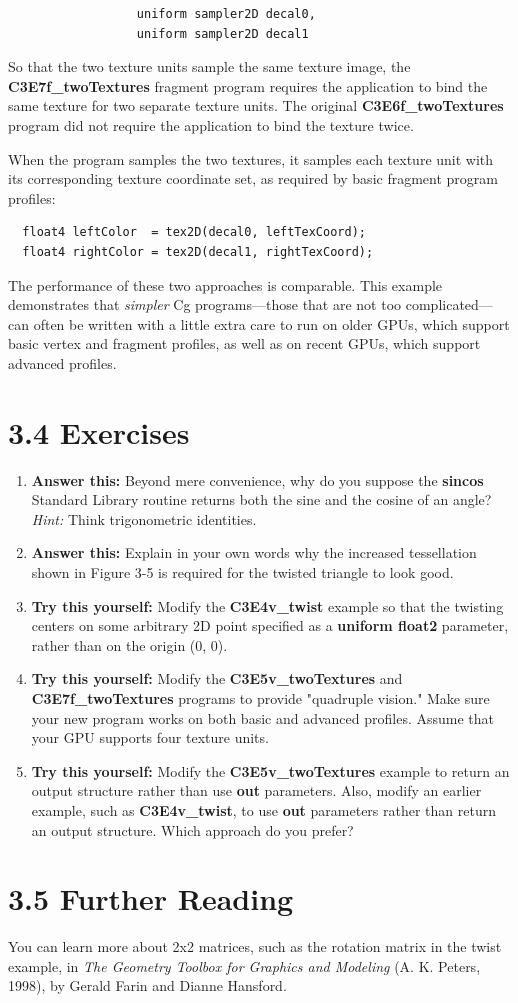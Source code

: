 \documentclass{book}
\begin{document}
\FloatBarrier
\begin{lstlisting}                  
                  uniform sampler2D decal0,
                  uniform sampler2D decal1
\end{lstlisting}
\FloatBarrier

So that the two texture units sample the same texture image, the \textbf{C3E7f_twoTextures} fragment program requires the application to bind the same texture for two separate texture units. The original \textbf{C3E6f_twoTextures} program did not require the application to bind the texture twice.

When the program samples the two textures, it samples each texture unit with its corresponding texture coordinate set, as required by basic fragment program profiles:

\FloatBarrier
\begin{lstlisting} 
  float4 leftColor  = tex2D(decal0, leftTexCoord);
  float4 rightColor = tex2D(decal1, rightTexCoord);
\end{lstlisting}
\FloatBarrier

The performance of these two approaches is comparable. This example demonstrates that \textit{simpler} Cg programs—those that are not too complicated—can often be written with a little extra care to run on older GPUs, which support basic vertex and fragment profiles, as well as on recent GPUs, which support advanced profiles.

\section{3.4 Exercises}

\begin{enumerate}
\item \textbf{Answer this:} Beyond mere convenience, why do you suppose the \textbf{sincos} Standard Library routine returns both the sine and the cosine of an angle? \textit{Hint:} Think trigonometric identities.
\item \textbf{Answer this:} Explain in your own words why the increased tessellation shown in Figure 3-5 is required for the twisted triangle to look good.
\item \textbf{Try this yourself:} Modify the \textbf{C3E4v_twist} example so that the twisting centers on some arbitrary 2D point specified as a \textbf{uniform float2} parameter, rather than on the origin (0, 0).
\item \textbf{Try this yourself:} Modify the \textbf{C3E5v_twoTextures} and \textbf{C3E7f_twoTextures} programs to provide "quadruple vision." Make sure your new program works on both basic and advanced profiles. Assume that your GPU supports four texture units.
\item \textbf{Try this yourself:} Modify the \textbf{C3E5v_twoTextures} example to return an output structure rather than use \textbf{out} parameters. Also, modify an earlier example, such as \textbf{C3E4v_twist}, to use \textbf{out} parameters rather than return an output structure. Which approach do you prefer?
\end{enumerate}

\section{3.5 Further Reading}

You can learn more about 2x2 matrices, such as the rotation matrix in the twist example, in \textit{The Geometry Toolbox for Graphics and Modeling} (A. K. Peters, 1998), by Gerald Farin and Dianne Hansford.
\end{document}
